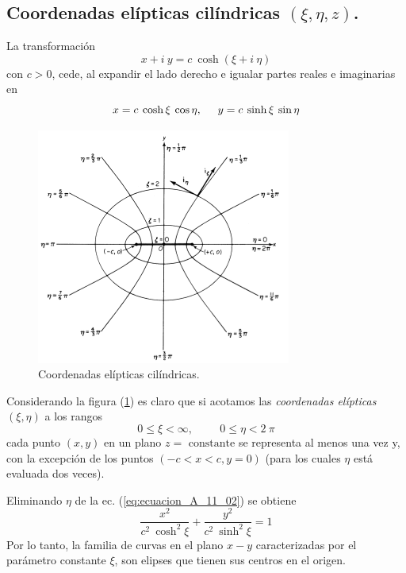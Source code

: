 \subsection{Coordenadas elípticas cilíndricas $(\xi, \eta, z)$.}
La transformación
\begin{equation}
    x + i \: y = c \: \cosh (\xi + i \: \eta)
    \label{eq:ecuacion_A_11_01}
\end{equation}
con $c > 0$, cede, al expandir el lado derecho e igualar partes reales e imaginarias en
\begin{equation}
    x = c \: \cosh \xi \: \cos \eta, \hspace{0.5cm} y = c \: \sinh \xi \: \sin \eta
    \label{eq:ecuacion_A_11_02}
\end{equation}
\begin{figure}[H]
    \centering
    \includegraphics{./Imagenes/Sistema_02_Eliptico_Cilindrico.png}
    \caption{Coordenadas elípticas cilíndricas.}
    \label{fig:figura_coordenadas_elipticas}
\end{figure}
Considerando la figura (\ref{fig:figura_coordenadas_elipticas}) es claro que si acotamos las \emph{coordenadas elípticas} $(\xi, \eta)$ a los rangos
\begin{equation}
    0 \leq \xi < \infty, \hspace{1cm} 0 \leq \eta < 2 \: \pi
    \label{eq:ecuacion_A_11_03}
\end{equation}
cada punto $(x, y)$ en un plano $z = \mbox{ constante}$ se representa al menos una vez y, con la excepción de los puntos $(-c < x < c, y = 0)$ (para los cuales $\eta$ está evaluada dos veces).
\par
Eliminando $\eta$ de la ec. (\ref{eq:ecuacion_A_11_02}) se obtiene
\begin{equation}
    \dfrac{x^{2}}{c^{2} \: \cosh^{2} \xi} + \dfrac{y^{2}}{c^{2} \: \sinh^{2} \xi} = 1
    \label{eq:ecuacion_A_11_04} 
\end{equation}
Por lo tanto, la familia de curvas en el plano $x-y$ caracterizadas por el parámetro constante $\xi$, son elipses que tienen sus centros en el origen. 


